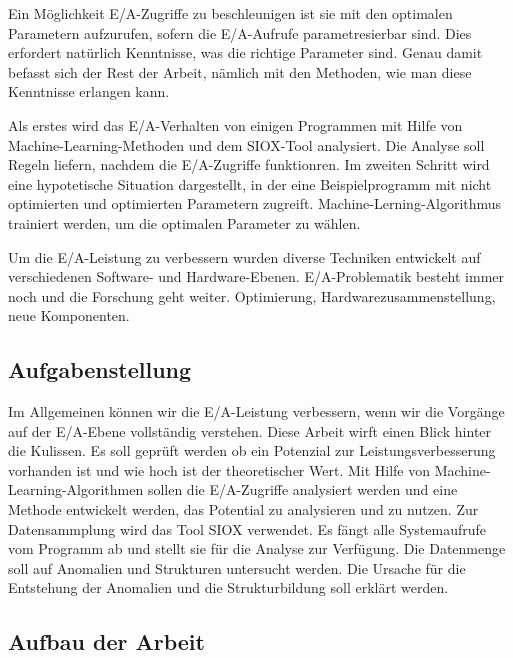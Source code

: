 Ein Möglichkeit E/A-Zugriffe zu beschleunigen ist sie mit den optimalen Parametern aufzurufen, sofern die E/A-Aufrufe parametresierbar sind. Dies erfordert natürlich Kenntnisse, was die richtige Parameter sind. Genau damit befasst sich der Rest der Arbeit, nämlich mit den Methoden, wie man diese Kenntnisse erlangen kann.

Als erstes wird das E/A-Verhalten von einigen Programmen mit Hilfe von Machine-Learning-Methoden und dem SIOX-Tool analysiert. Die Analyse soll Regeln liefern, nachdem die E/A-Zugriffe funktionren. Im zweiten Schritt wird eine hypotetische Situation dargestellt, in der eine Beispielprogramm mit nicht optimierten und optimierten Parametern zugreift.  Machine-Lerning-Algorithmus trainiert werden, um die optimalen Parameter zu wählen.

Um die E/A-Leistung zu verbessern wurden diverse Techniken entwickelt auf verschiedenen Software- und Hardware-Ebenen. E/A-Problematik besteht immer noch und die Forschung geht weiter. Optimierung, Hardwarezusammenstellung, neue Komponenten.

\subsection{Aufgabenstellung}
Im Allgemeinen können wir die E/A-Leistung verbessern, wenn wir die Vorgänge auf der E/A-Ebene vollständig verstehen. Diese Arbeit wirft einen Blick hinter die Kulissen. Es soll geprüft werden ob ein Potenzial zur Leistungsverbesserung vorhanden ist und wie hoch ist der theoretischer Wert. Mit Hilfe von Machine-Learning-Algorithmen sollen die E/A-Zugriffe analysiert werden und eine Methode entwickelt werden, das Potential zu analysieren und zu nutzen. Zur Datensammplung wird das Tool SIOX verwendet. Es fängt alle Systemaufrufe vom Programm ab und stellt sie für die Analyse zur Verfügung. Die Datenmenge soll auf Anomalien und Strukturen untersucht werden. Die Ursache für die Entstehung der Anomalien und die Strukturbildung soll erklärt werden.


\subsection{Aufbau der Arbeit}

